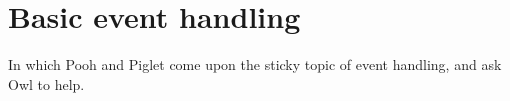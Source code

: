 \chapter{Basic event handling}\label{chapbasicevents}
%
%
\setfooter{\thepage}{}{}{}{}{\thepage}%

In which Pooh and Piglet come upon the sticky topic of event handling, and ask Owl to help.

